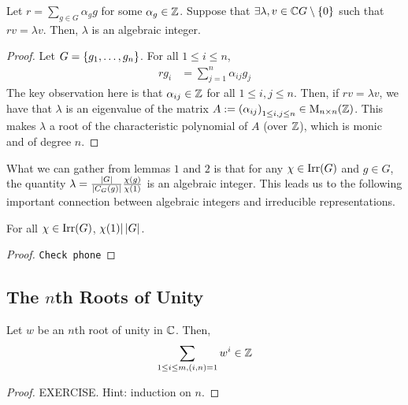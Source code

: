 \begin{lemma}
    Let $r = \sum_{g \in G} \alpha_g g$ for some $\alpha_g \in \mathbb{Z}$. Suppose that $\exists \lambda, v \in \mathbb{C} G \setminus \left\{ 0 \right\}$ such that $rv = \lambda v$. Then, $\lambda$ is an algebraic integer.
\end{lemma}
\begin{proof}
    Let $G = \left\{ g_1, \ldots, g_n \right\}$. For all $1 \leq i \leq n$,
    \begin{align*}
        r g_i &= \sum_{j=1}^{n} \alpha_{ij} g_j
    \end{align*}
    The key observation here is that $\alpha_{ij} \in \mathbb{Z}$ for all $1 \leq i,j \leq n$. %
    Then, if $rv = \lambda v$, we have that $\lambda$ is an eigenvalue of the matrix $A := \left( \alpha_{ij} \right)_{1 \leq i,j \leq n} \in \operatorname{M}_{{n} \times {n}}\!\left( {\mathbb{Z}} \right)$. This makes $\lambda$ a root of the characteristic polynomial of $A$ (over $\mathbb{Z}$), which is monic and of degree $n$.
\end{proof}

What we can gather from lemmas $1$ and $2$ is that for any $\chi \in \operatorname{Irr}\!\left( G \right)$ and $g \in G$, the quantity $\lambda = \frac{\left\lvert G \right\rvert}{\left\lvert C_G(g) \right\rvert} \frac{\chi(g)}{\chi(1)}$ is an algebraic integer. This leads us to the following important connection between algebraic integers and irreducible representations.

\begin{theorem} \label{Ch2:Thm:Char_div_Ord_Grp}
    For all $\chi \in \operatorname{Irr}\!\left( G \right)$, $\chi(1) \vert \left\lvert G \right\rvert$.
\end{theorem}
\begin{proof}
    \verb|Check phone|
\end{proof}

\subsection{The $n$th Roots of Unity}

\begin{lemma} \label{Ch3:Lem:Int_Sum_Coprime_Roots_Unity}
    Let $w$ be an $n$th root of unity in $\mathbb{C}$. Then,
    \begin{align*}
        \sum_{1 \leq i \leq m, \left( i,n \right) = 1} w^i \in \mathbb{Z}
    \end{align*}
\end{lemma}
\begin{proof}
    EXERCISE. Hint: induction on $n$.
\end{proof}

